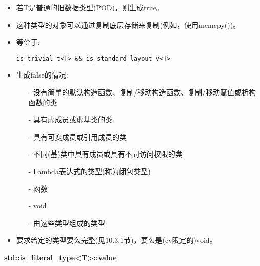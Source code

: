 \begin{itemize}
\item 
若T是普通的旧数据类型(POD)，则生成true。

\item 
这种类型的对象可以通过复制底层存储来复制(例如，使用memcpy())。

\item
等价于: 
\begin{lstlisting}[style=styleCXX]
is_trivial_t<T> && is_standard_layout_v<T>
\end{lstlisting}

\item
生成false的情况:

\begin{itemize}
\item [-]
没有简单的默认构造函数、复制/移动构造函数、复制/移动赋值或析构函数的类

\item [-]
具有虚成员或虚基类的类

\item [-]
具有可变成员或引用成员的类

\item [-]
不同(基)类中具有成员或具有不同访问权限的类

\item [-]
Lambda表达式的类型(称为闭包类型)

\item [-]
函数

\item [-]
void

\item [-]
由这些类型组成的类型
\end{itemize}

\item
要求给定的类型要么完整(见10.3.1节)，要么是(cv限定的)void。
\end{itemize}

\textbf{std::is\_literal\_type<T>::value}

